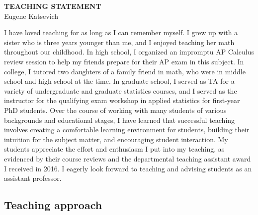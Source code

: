 \documentclass[11pt]{article}
\begin{document}
\thispagestyle{fancy}
\lhead{}
\rhead{}
\renewcommand{\headrulewidth}{0pt} 
\renewcommand{\footrulewidth}{0pt} 


\pagestyle{fancy}
\lhead{\textcolor{gray}{\it Eugene Katsevich}}
\rhead{\textcolor{gray}{\thepage/\totalpages{}}}


\begin{center}
{\LARGE \bf TEACHING STATEMENT}\\
\vspace*{0.1cm}
{\normalsize Eugene Katsevich}
\end{center}

I have loved teaching for as long as I can remember myself. I grew up with a sister who is three years younger than me, and I enjoyed teaching her math throughout our childhood. In high school, I organized an impromptu AP Calculus review session to help my friends prepare for their AP exam in this subject. In college, I tutored two daughters of a family friend in math, who were in middle school and high school at the time. In graduate school, I served as TA for a variety of undergraduate and graduate statistics courses, and I served as the instructor for the qualifying exam workshop in applied statistics for first-year PhD students. Over the course of working with many students of various backgrounds and educational stages, I have learned that successful teaching involves creating a comfortable learning environment for students, building their intuition for the subject matter, and encouraging student interaction. My students appreciate the effort and enthusiasm I put into my teaching, as evidenced by their course reviews and the departmental teaching assistant award I received in 2016. I eagerly look forward to teaching and advising students as an assistant professor.

\subsection*{Teaching approach}
\end{document}

